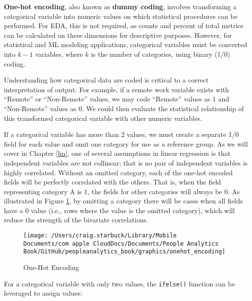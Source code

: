 \documentclass[
]{book}
\newenvironment{Shaded}{\begin{snugshade}}{\end{snugshade}}
\newcommand{\CommentTok}[1]{\textcolor[rgb]{0.56,0.35,0.01}{\textit{#1}}}
\newcommand{\FunctionTok}[1]{\textcolor[rgb]{0.00,0.00,0.00}{#1}}
\newcommand{\NormalTok}[1]{#1}
\newcommand{\SpecialCharTok}[1]{\textcolor[rgb]{0.00,0.00,0.00}{#1}}
\begin{document}
\textbf{One-hot encoding}, also known as \textbf{dummy coding}, involves transforming a categorical variable into numeric values on which statistical procedures can be performed. For EDA, this is not required, as counts and percent of total metrics can be calculated on these dimensions for descriptive purposes. However, for statistical and ML modeling applications, categorical variables must be converted into \(k-1\) variables, where \(k\) is the number of categories, using binary (1/0) coding.

Understanding how categorical data are coded is critical to a correct interpretation of output. For example, if a remote work variable exists with ``Remote'' or ``Non-Remote'' values, we may code ``Remote'' values as 1 and ``Non-Remote'' values as 0. We could then evaluate the statistical relationship of this transformed categorical variable with other numeric variables.

If a categorical variable has more than 2 values, we must create a separate 1/0 field for each value and omit one category for use as a reference group. As we will cover in Chapter \ref{lm}, one of several assumptions in linear regression is that independent variables are not collinear; that is no pair of independent variables is highly correlated. Without an omitted category, each of the one-hot encoded fields will be perfectly correlated with the others. That is, when the field representing category A is 1, the fields for other categories will always be 0. As illustrated in Figure \ref{fig:onehot-encoding}, by omitting a category there will be cases when all fields have a 0 value (i.e., rows where the value is the omitted category), which will reduce the strength of the bivariate correlations.

\begin{figure}

{\centering \texttt{[image: /Users/craig.starbuck/Library/Mobile Documents/com~apple~CloudDocs/Documents/People Analytics Book/GitHub/peopleanalytics\_book/graphics/onehot\_encoding]} 

}

\caption{One-Hot Encoding}\label{fig:onehot-encoding}
\end{figure}

For a categorical variable with only two values, the \texttt{ifelse()} function can be leveraged to assign values:

\begin{Shaded}
\end{Shaded}
\end{document}
